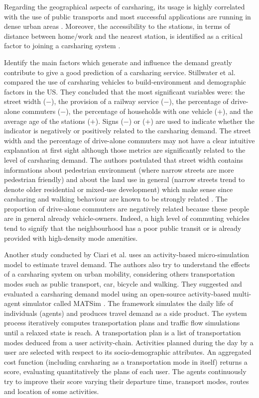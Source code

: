 \bigskip
Regarding the geographical aspects of carsharing, its usage is highly correlated with the use of public transports and most successful applications are running in dense urban areas \cite{cervero_city_2003, millard_ball_car_sharing_2005, burkhardt_who_2006}.
Moreover, the accessibility to the stations, in terms of distance between home/work and the nearest station, is identified as a critical factor to joining a carsharing system \cite{zheng_carsharing_2009, costain_synopsis_2012, efthymiou_which_2012}.


\medskip
Identify the main factors which generate and influence the demand greatly contribute to give a good prediction of a carsharing service.
Stillwater et al. \cite{stillwater_carsharing_2009} compared the use of carsharing vehicles to build-environment and demographic factors in the US.
They concluded that the most significant variables were: the street width ($-$), the provision of a railway service ($-$), the percentage of drive-alone commuters ($-$), 
the percentage of households with one vehicle ($+$), and the average age of the stations ($+$).
Signs ($-$) or ($+$) are used to indicate whether the indicator is negatively or positively related to the carsharing demand.
The street width and the percentage of drive-alone commuters may not have a clear intuitive explanation at first sight although those metrics are significantly related to the level of carsharing demand.
The authors postulated that street width contains informations about pedestrian environment (where narrow streets are more pedestrian friendly) and about the land use in general (narrow streets trend to denote older residential or mixed-use development) which make sense since carsharing and walking behaviour are known to be strongly related \cite{cervero_city_2003}.
The proportion of drive-alone commuters are negatively related because these people are in general already vehicle-owners.
Indeed, a high level of commuting vehicles tend to signify that the neighbourhood has a poor public transit or is already provided with high-density mode amenities.


\medskip
Another study conducted by Ciari et al. \cite{ciari_estimation_2013} uses an activity-based micro-simulation model to estimate travel demand.
The authors also try to understand the effects of a carsharing system on urban mobility, considering others transportation modes such as public transport, car, bicycle and walking.
They suggested and evaluated a carsharing demand model using an open-source activity-based multi-agent simulator called MATSim \cite{matsim_webPage}.
The framework simulates the daily life of individuals (agents) and produces travel demand as a side product.
The system process iteratively computes transportation plans and traffic flow simulations until a relaxed state is reach.
A transportation plan is a list of transportation modes deduced from a user activity-chain.
Activities planned during the day by a user are selected with respect to its socio-demographic attributes.
An aggregated cost function (including carsharing as a transportation mode in itself) returns a score, evaluating quantitatively the plans of each user.
The agents continuously try to improve their score varying their departure time, transport modes, routes and location of some activities.

